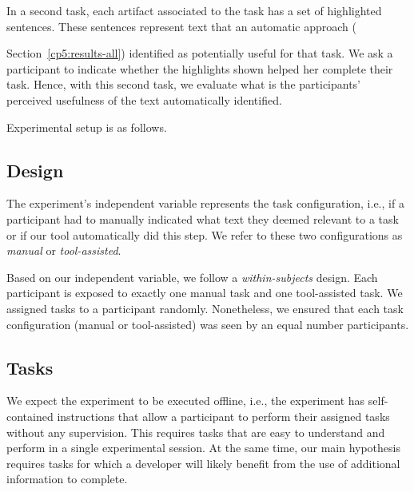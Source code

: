 In a second task, each artifact associated to the task has a set of highlighted sentences. These 
sentences represent text that an automatic approach ({Section~\ref{cp5:results-all}) identified as potentially useful for that task. 
We ask a participant to indicate whether the highlights shown helped her complete their task.
Hence, with this second task, we evaluate what is the participants' perceived usefulness of the text automatically identified.


Experimental setup is as follows.







\subsection{Design}


The experiment's independent variable represents the task configuration, i.e., if a participant had to manually indicated what text they deemed relevant to a task
or if our tool automatically did this step. We refer to these two configurations as \textit{manual} or \textit{tool-assisted}. 


Based on our independent variable, we follow a \textit{within-subjects} design. Each participant is exposed to exactly one manual task and one tool-assisted task.
We assigned tasks to a participant randomly. Nonetheless,  
we ensured that each task configuration (manual or tool-assisted) was seen by an equal number participants.








\subsection{Tasks}
\label{sec:experiment-tasks}



We expect the experiment to be executed offline, i.e., the experiment has self-contained instructions that allow a participant to perform their assigned tasks without any supervision.
This requires tasks that are easy to understand and perform in a single experimental session. At the same time, our main hypothesis requires tasks for which a developer will likely benefit from the use of additional information to complete.


}
